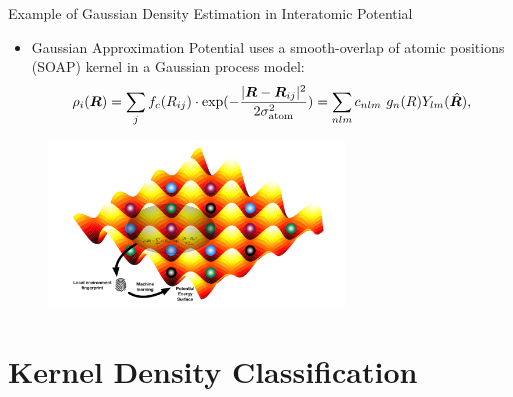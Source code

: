 \documentclass{beamer}
\begin{document}
 \begin{frame}{Example of Gaussian Density Estimation in Interatomic Potential}
    \begin{itemize}
        \item Gaussian Approximation Potential\cite{bartokGaussianApproximationPotentials2010} uses a smooth-overlap of atomic positions (SOAP) kernel in a Gaussian process model:
    \begin{eqnarray*}
        \rho_{i}(\boldsymbol{R}) = \sum_{j} f_{c}(R_{ij}) \cdot \exp(-\frac{|\boldsymbol{R} - \boldsymbol{R}_{ij}|^{2}}{2\sigma_{\rm atom}^{2}}) = \sum_{nlm} c_{nlm} \ g_{n}(R) Y_{lm}(\hat{\boldsymbol{R}}),
    \end{eqnarray*}
    \end{itemize}
    \begin{figure}
        \centering
        \includegraphics[width=0.7\textwidth]{figures/PES.png}
    \end{figure}
\end{frame}


\section{Kernel Density Classification}
\end{document}
